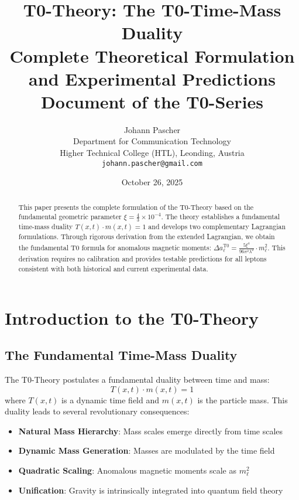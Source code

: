 \documentclass[12pt,a4paper]{article}
\title{\textbf{T0-Theory: The T0-Time-Mass Duality}\\[0.5cm]
	\large Complete Theoretical Formulation and Experimental Predictions\\[0.3cm]
	\normalsize Document of the T0-Series}
\author{Johann Pascher\\
	Department for Communication Technology\\
	Higher Technical College (HTL), Leonding, Austria\\
	\texttt{johann.pascher@gmail.com}}
\date{October 26, 2025}
\begin{document}
	
	\maketitle
	
	\begin{abstract}
		This paper presents the complete formulation of the T0-Theory based on the fundamental geometric parameter $\xi = \frac{4}{3} \times 10^{-4}$. The theory establishes a fundamental time-mass duality $T(x,t) \cdot m(x,t) = 1$ and develops two complementary Lagrangian formulations. Through rigorous derivation from the extended Lagrangian, we obtain the fundamental T0 formula for anomalous magnetic moments: $\Delta a_\ell^{\mathrm{T0}} = \frac{5\xi^4}{96\pi^2\lambda^2} \cdot m_\ell^2$. This derivation requires no calibration and provides testable predictions for all leptons consistent with both historical and current experimental data.
	\end{abstract}
	
	\tableofcontents
	\newpage
	
	\section{Introduction to the T0-Theory}
	
	\subsection{The Fundamental Time-Mass Duality}
	
	The T0-Theory postulates a fundamental duality between time and mass:
	\begin{equation}
		T(x,t) \cdot m(x,t) = 1
	\end{equation}
	where $T(x,t)$ is a dynamic time field and $m(x,t)$ is the particle mass. This duality leads to several revolutionary consequences:
	
	\begin{itemize}
		\item \textbf{Natural Mass Hierarchy}: Mass scales emerge directly from time scales
		\item \textbf{Dynamic Mass Generation}: Masses are modulated by the time field
		\item \textbf{Quadratic Scaling}: Anomalous magnetic moments scale as $m_\ell^2$
		\item \textbf{Unification}: Gravity is intrinsically integrated into quantum field theory
	\end{itemize}
	
\end{document}
